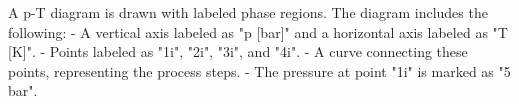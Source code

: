 A p-T diagram is drawn with labeled phase regions. The diagram includes the following:  
- A vertical axis labeled as "p [bar]" and a horizontal axis labeled as "T [K]".  
- Points labeled as "1i", "2i", "3i", and "4i".  
- A curve connecting these points, representing the process steps.  
- The pressure at point "1i" is marked as "5 bar".